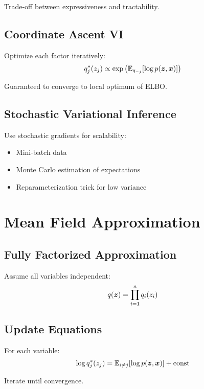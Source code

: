 Trade-off between expressiveness and tractability.

\subsection{Coordinate Ascent VI}

Optimize each factor iteratively:
\begin{equation}
q_j^*(z_j) \propto \exp\left(\mathbb{E}_{q_{-j}}[\log p(\boldsymbol{z}, \boldsymbol{x})]\right)
\end{equation}

Guaranteed to converge to local optimum of ELBO.

\subsection{Stochastic Variational Inference}

Use stochastic gradients for scalability:
\begin{itemize}
    \item Mini-batch data
    \item Monte Carlo estimation of expectations
    \item Reparameterization trick for low variance
\end{itemize}

\section{Mean Field Approximation}
\label{sec:mean-field}

\subsection{Fully Factorized Approximation}

Assume all variables independent:
\begin{equation}
q(\boldsymbol{z}) = \prod_{i=1}^{n} q_i(z_i)
\end{equation}

\subsection{Update Equations}

For each variable:
\begin{equation}
\log q_j^*(z_j) = \mathbb{E}_{i \neq j}[\log p(\boldsymbol{z}, \boldsymbol{x})] + \text{const}
\end{equation}

Iterate until convergence.

